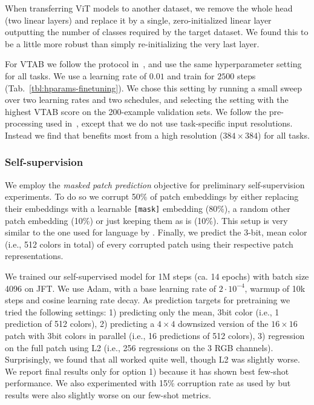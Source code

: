 When transferring ViT models to another dataset, we remove the whole head (two linear layers) and replace it by a single, zero-initialized linear layer outputting the number of classes required by the target dataset.
We found this to be a little more robust than simply re-initializing the very last layer.

For VTAB we follow the protocol in~\citet{kolesnikov2020-bit}, and use the same hyperparameter setting for all tasks.
We use a learning rate of $0.01$ and train for $2500$ steps (Tab.~\ref{tbl:hparams-finetuning}).
We chose this setting by running a small sweep over two learning rates and two schedules, and selecting the setting with the highest VTAB score on the 200-example validation sets.
We follow the pre-processing used in~\cite{kolesnikov2020-bit}, except that we do not use task-specific input resolutions.
Instead we find that \oursfull{} benefits most from a high resolution ($384\times 384$) for all tasks.

\subsubsection{Self-supervision}\label{sec:self_supervision}

We employ the \textit{masked patch prediction} objective for preliminary self-supervision experiments. To do so we corrupt 50\% of patch embeddings by either replacing their embeddings with a learnable \verb|[mask]| embedding (80\%), a random other patch embedding (10\%) or just keeping them as is (10\%). This setup is very similar to the one used for language by \citet{devlin19-bert}. Finally, we predict the 3-bit, mean color (i.e., 512 colors in total) of every corrupted patch using their respective patch representations.

We trained our self-supervised model for 1M steps (ca. 14 epochs) with batch size 4096 on JFT. We use Adam, with a base learning rate of $2 \cdot 10^{-4}$, warmup of 10k steps and cosine learning rate decay. As prediction targets for pretraining we tried the following settings: 1) predicting only the mean, 3bit color (i.e., 1 prediction of 512 colors), 2) predicting a $4 \times 4$ downsized version of the $16 \times 16$ patch with 3bit colors in parallel (i.e., 16 predictions of 512 colors), 3) regression on the full patch using L2 (i.e., 256 regressions on the 3 RGB channels). Surprisingly, we found that all worked quite well, though L2 was slightly worse. We report final results only for option 1) because it has shown best few-shot performance. We also experimented with 15\% corruption rate as used by \citet{devlin19-bert} but results were also slightly worse on our few-shot metrics.

